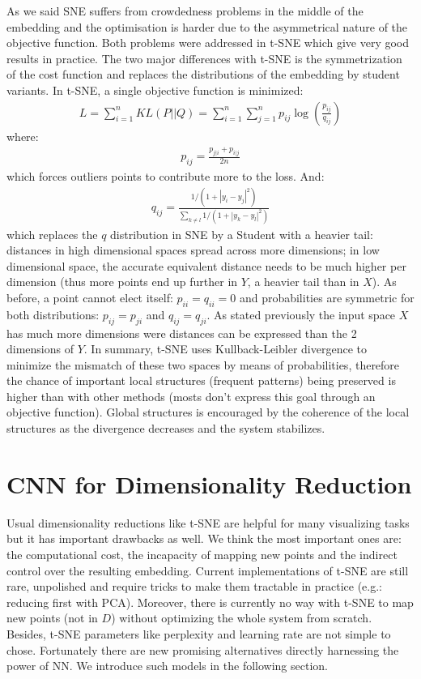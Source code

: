 \documentclass[a4paper,12pt]{report}
\newcommand{\eg}{e.g.}
\begin{document}
As we said SNE suffers from crowdedness problems in the middle of the embedding and the optimisation is harder due to the asymmetrical nature of the objective function.
Both problems were addressed in t-SNE which give very good results in practice.
The two major differences with t-SNE is the symmetrization of the cost function and replaces the distributions of the embedding by student variants.
In t-SNE, a single objective function is minimized:
\begin{eqnarray}
    L = \sum_{i=1}^n KL(P || Q) = \sum_{i=1}^n \sum_{j=1}^n p_{ij} \log\left(\frac{p_{ij}}{q_{ij}}\right)
\end{eqnarray}
where:
\begin{eqnarray}
    p_{ij} = \frac{p_{j|i} + p_{i|j}}{2 n}
\end{eqnarray}
which forces outliers points to contribute more to the loss.
And:
\begin{eqnarray}
    q_{ij} = \frac{1 / (1 + |y_i - y_j|^2)}{\sum_{k \not = l} 1/(1 + |y_k - y_l|^2)}
\end{eqnarray}
which replaces the $q$ distribution in SNE by a Student with a heavier tail: distances in high dimensional spaces spread across more dimensions; in low dimensional space, the accurate equivalent distance needs to be much higher per dimension (thus more points end up further in $Y$, a heavier tail than in $X$).
As before, a point cannot elect itself: $p_{ii} = q_{ii} = 0$ and probabilities are symmetric for both distributions: $p_{ij} = p_{ji}$ and $q_{ij} = q_{ji}$.
As stated previously the input space $X$ has much more dimensions were distances can be expressed than the 2 dimensions of $Y$.
In summary, t-SNE uses Kullback-Leibler divergence to minimize the mismatch of these two spaces by means of probabilities, therefore the chance of important local structures (frequent patterns) being preserved is higher than with other methods (mosts don't express this goal through an objective function).
Global structures is encouraged by the coherence of the local structures as the divergence decreases and the system stabilizes.

\section{CNN for Dimensionality Reduction}
Usual dimensionality reductions like t-SNE are helpful for many visualizing tasks but it has important drawbacks as well.
We think the most important ones are: the computational cost, the incapacity of mapping new points and the indirect control over the resulting embedding.
Current implementations of t-SNE are still rare, unpolished and require tricks to make them tractable in practice (\eg: reducing first with PCA).
Moreover, there is currently no way with t-SNE to map new points (not in $D$) without optimizing the whole system from scratch.
Besides, t-SNE parameters like perplexity and learning rate are not simple to chose.
Fortunately there are new promising alternatives directly harnessing the power of NN.
We introduce such models in the following section.
\end{document}
